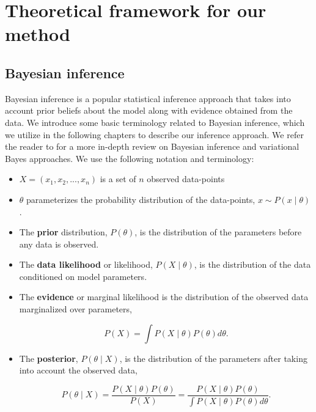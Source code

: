 \section{Theoretical framework for our method}
\label{sec:ch4-theory}
\subsection{Bayesian inference}
Bayesian inference is a popular statistical inference approach that takes into account prior beliefs about the model along with evidence obtained from the data.
%
We introduce some basic terminology related to Bayesian inference, which we utilize in the following chapters to describe our inference approach.
%
We refer the reader to \cite{blei2017variational,bishop2006pattern} for a more in-depth review on Bayesian inference and variational Bayes approaches.
%
We use the following notation and terminology:
%
\begin{itemize}
    \item $X = (x_1, x_2, ..., x_n)$ is a set of $n$ observed data-points 
    \item $\theta$ parameterizes the probability distribution of the data-points, $x \sim P(x \mid \theta)$.
    \item The \textbf{prior} distribution, $P(\theta)$, is the distribution of the parameters before any data is observed.
    \item The \textbf{data likelihood} or likelihood, $P(X \mid \theta)$, is the distribution of the data conditioned on model parameters.
    \item The \textbf{evidence} or marginal likelihood is the distribution of the observed data marginalized over parameters,
    
    \begin{equation}
        P(X) = \int P(X \mid \theta) P(\theta) d \theta \nonumber.
    \end{equation} 
    
    \item The \textbf{posterior}, $P(\theta \mid X)$, is the distribution of the parameters after taking into account the observed data,
    
    \begin{equation}
        P(\theta \mid X) = \frac{P(X \mid \theta) P(\theta)}{P(X)} = \frac{P(X \mid \theta) P(\theta)}{\int P(X \mid \theta) P(\theta) d \theta} \nonumber.
    \end{equation}
    
\end{itemize}
%

